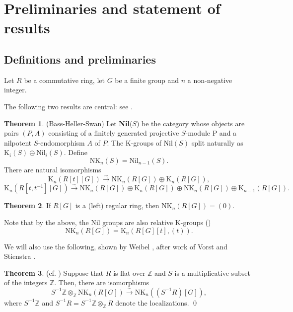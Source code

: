 \documentclass[reqno,11pt,letterpaper]{amsart}
\theoremstyle{plain}
\numberwithin{equation}{subsection}
\newtheorem{theorem}[equation]{Theorem}
\theoremstyle{remark}
\theoremstyle{plain}
\theoremstyle{definition}\newtheorem*{notation}{Notation}
\newtheorem{theorem}{Theorem}
\newcommand{\RK}{\mathrm{K}}
\newcommand{\RNK}{\mathrm{NK}}
\newcommand{\BZ}{\mathbb{Z}}
\begin{document}
 
 

 
 \section{Preliminaries and statement of results}\label{s:1}

\subsection{ Definitions and preliminaries}
Let $ R$ be a commutative ring, let $G$ be a finite group and $n$ a non-negative integer.
  
  
The following two results are central: see \cite[5.3.30]{Rosenberg}.
 
 
\begin{theorem}\label{thm:BHS}(Bass-Heller-Swan)
Let {\bf Nil}($S$) be the category whose objects are pairs $(P,A)$ consisting of a finitely generated projective $S$-module P and a nilpotent $S$-endomorphism $A$ of $P$.  The $\RK$-groups of ${\mathrm {Nil}}(S)$ split naturally as $\RK_i(S) \oplus \mathrm{Nil}_i(S)$.     
Define 
\[
\RNK_n(S) = \mathrm{Nil}_{n-1}(S).
\]
There are natural isomorphisms
\begin{equation*}
\RK_{n}( R[ t] [ G] )  \xrightarrow{\sim} \RNK_{n}( R [ G] ) \oplus \RK_{n}( R[ G]),
\end{equation*}
\begin{equation*}
\RK_{n}( R[ t,t^{-1}] [ G] )  \xrightarrow{\sim} \RNK_{n}( R [ G] ) \oplus \RK_{n}( R[ G]
) \oplus \RNK_{n}( R [ G] ) \oplus
\RK_{n-1}( R[ G] ) .
\end{equation*}
\end{theorem}
 

\begin{theorem}
\label{cor:easyregular}
If $R[G]$ is a (left) regular ring, then $\RNK_{n}(R[G]
) =(0) $.
\end{theorem}

Note that by the above, the Nil  groups are  also relative $\RK$-groups (\cite{WeibelKbook})
\begin{equation}\label{nilrelative}
\RNK_n(R[G])=\RK_n(R[G][t], (t)).
\end{equation}

We will also use the following, shown by Weibel \cite{WMV}, after work of Vorst \cite{Vorst} and Stienstra \cite{Stienstra}.

\begin{theorem}\label{thm:localization} (cf. \cite[Cor. 6.4]{WMV}) Suppose that $R$ is flat over $\BZ$ and $S$ is a multiplicative subset of the integers $\BZ$. Then, there
are isomorphisms
\begin{equation}\label{eq:localization}
S^{-1}\BZ\otimes_\BZ \RNK_n(R[G])\xrightarrow{\sim} \RNK_n((S^{-1} R)[G]),
\end{equation}
where $S^{-1}\BZ$ and $S^{-1}R=S^{-1}\BZ\otimes_\BZ R$ denote the localizations. \qed
\end{theorem}
\end{document}
